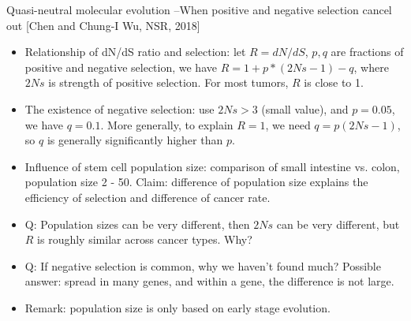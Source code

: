 \documentclass{report}
\begin{document}
Quasi-neutral molecular evolution –When positive and negative selection cancel out [Chen and Chung-I Wu, NSR, 2018]
\begin{itemize}
	\item Relationship of dN/dS ratio and selection: let $R = dN/dS$, $p,q$ are fractions of positive and negative selection, we have $R = 1 + p * (2Ns - 1) - q$, where $2Ns$ is strength of positive selection. For most tumors, $R$ is close to 1.
	
	\item The existence of negative selection: use $2Ns > 3$ (small value), and $p = 0.05$, we have $q =  0.1$. More generally, to explain $R = 1$, we need $q = p (2Ns - 1)$, so $q$ is generally significantly higher than $p$.
	
	\item Influence of stem cell population size: comparison of small intestine vs. colon, population size 2 - 50. Claim: difference of population size explains the efficiency of selection and difference of cancer rate.
	
	\item Q: Population sizes can be very different, then $2Ns$ can be very different, but $R$ is roughly similar across cancer types. Why?
	
	\item Q: If negative selection is common, why we haven’t found much? Possible answer: spread in many genes, and within a gene, the difference is not large.
	
	\item Remark: population size is only based on early stage evolution.
\end{itemize}
\end{document}
